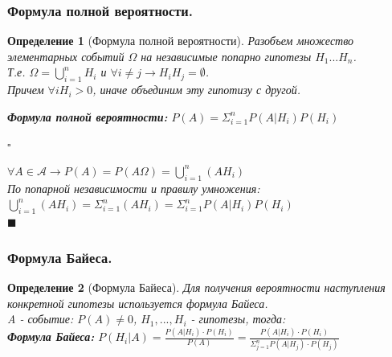 \documentclass[14pt]{extarticle}
\theoremstyle{breakstyle}
\newtheorem{definition}{Определение}[subsection]
\begin{document}
\subsubsection{Формула полной вероятности.}
\begin{definition}[Формула полной вероятности]

Разобъем множество элементарных событий $\Omega$ на независимые попарно гипотезы $H_{1} ... H_{n}$. \\
Т.е. $\Omega = \bigcup_{i=1}^{n}H_{i}$ и $\forall i \neq j \rightarrow H_{i}H_{j} = \emptyset$. \\
Причем $\forall i H_{i} > 0$, иначе объединим эту гипотизу с другой. \\

\vspace{\baselineskip}

\textbf{Формула полной вероятности:} $P(A) = \Sigma_{i=1}^{n}P(A | H_{i})P(H_{i})$

$\square$

$\forall A \in \mathscr{A} \rightarrow P(A) = P(A \Omega) = \bigcup_{i=1}^{n}(AH_{i})$ \\
По попарной независимости и правилу умножения: $\bigcup_{i=1}^{n}(AH_{i}) = \Sigma_{i=1}^{n}(AH_{i}) = \Sigma_{i=1}^{n}P(A | H_{i})P(H_{i})$ \\

\hfill$\blacksquare$

\end{definition}

\subsubsection{Формула Байеса.}
\begin{definition}[Формула Байеса]

Для получения вероятности наступления конкретной гипотезы используется формула Байеса. \\

A - событие: $P(A) \neq 0$, $H_{1}, ... , H_{i}$ - гипотезы, тогда: \\
\textbf{Формула Байеса:} $P(H_{i} | A) = \frac{P(A | H_{i}) \cdot P(H_{i})}{P(A)} = \frac{P(A | H_{i}) \cdot P(H_{i})}{\Sigma_{j=1}^{n}P(A | H_{j}) \cdot P(H_{j})}$

\end{definition}
\end{document}
